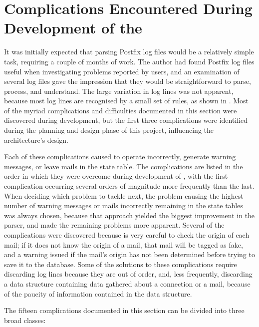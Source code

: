 \section{Complications Encountered During Development of the \parsernamelong{}}

\label{complications}

It was initially expected that parsing Postfix log files would be a
relatively simple task, requiring a couple of months of work.  The author
had found Postfix log files useful when investigating problems reported by
users, and an examination of several log files gave the impression that
they would be straightforward to parse, process, and understand.  The large
variation in log lines was not apparent, because most log lines are
recognised by a small set of rules, as shown in .  Most of the myriad complications and difficulties documented in
this section were discovered during \parsernames{} development, but the
first three complications were identified during the planning and design
phase of this project, influencing the architecture's design.

Each of these complications caused \parsername{} to operate incorrectly,
generate warning messages, or leave mails in the state table.  The
complications are listed in the order in which they were overcome during
development of \parsername{}, with the first complication occurring several
orders of magnitude more frequently than the last.  When deciding which
problem to tackle next, the problem causing the highest number of warning
messages or mails incorrectly remaining in the state tables was always
chosen, because that approach yielded the biggest improvement in the
parser, and made the remaining problems more apparent.  Several of the
complications were discovered because \parsername{} is very careful to
check the origin of each mail; if it does not know the origin of a mail,
that mail will be tagged as fake, and a warning issued if the mail's origin
has not been determined before trying to save it to the database.  Some of
the solutions to these complications require discarding log lines because
they are out of order, and, less frequently, discarding a data structure
containing data gathered about a connection or a mail, because of the
paucity of information contained in the data structure.

The fifteen complications documented in this section can be divided into
three broad classes:

